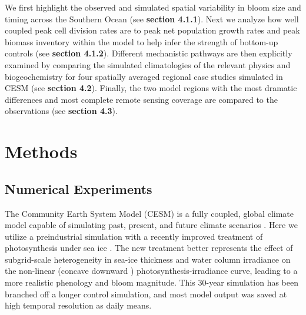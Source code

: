 We first highlight the observed and simulated spatial variability in bloom size and timing across the Southern Ocean (see \textbf{section 4.1.1}). Next we analyze how well coupled peak cell division rates are to peak net population growth rates and peak biomass inventory within the model to help infer the strength of bottom-up controls (see \textbf{section 4.1.2}). Different mechanistic pathways are then explicitly examined by comparing the simulated climatologies of the relevant physics and biogeochemistry for four spatially averaged regional case studies simulated in CESM (see \textbf{section 4.2}). Finally, the two model regions with the most dramatic differences and most complete remote sensing coverage are compared to the observations (see \textbf{section 4.3}).  


\section{Methods}

\subsection{Numerical Experiments}

The Community Earth System Model (CESM) is a fully coupled, global climate model capable of simulating past, present, and future climate scenarios \parencite{HurrellCommunityEarthSystem2013}. Here we utilize a preindustrial simulation with a recently improved treatment of photosynthesis under sea ice \parencite{LongModelingphotosynthesissea2015}. The new treatment better represents the effect of subgrid-scale heterogeneity in sea-ice thickness and water column irradiance on the non-linear (concave downward \parencite{Geiderdynamicregulatorymodel1998}) photosynthesis-irradiance curve, leading to a more realistic phenology and bloom magnitude. This 30-year simulation has been branched off a longer control simulation, and most model output was saved at high temporal resolution as daily means. 

